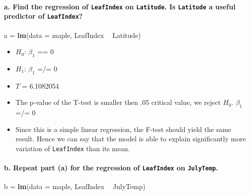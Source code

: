 \documentclass[]{article}
\newenvironment{Shaded}{\begin{snugshade}}{\end{snugshade}}
\newcommand{\KeywordTok}[1]{\textcolor[rgb]{0.13,0.29,0.53}{\textbf{#1}}}
\newcommand{\DataTypeTok}[1]{\textcolor[rgb]{0.13,0.29,0.53}{#1}}
\newcommand{\StringTok}[1]{\textcolor[rgb]{0.31,0.60,0.02}{#1}}
\newcommand{\OperatorTok}[1]{\textcolor[rgb]{0.81,0.36,0.00}{\textbf{#1}}}
\newcommand{\NormalTok}[1]{#1}
\providecommand{\tightlist}{%
  \setlength{\itemsep}{0pt}\setlength{\parskip}{0pt}}
\let\oldparagraph\paragraph
\renewcommand{\paragraph}[1]{\oldparagraph{#1}\mbox{}}
\begin{document}
\paragraph{\texorpdfstring{a. Find the regression of \texttt{LeafIndex}
on \texttt{Latitude}. Is \texttt{Latitude} a useful predictor of
\texttt{LeafIndex}?}{a. Find the regression of LeafIndex on Latitude. Is Latitude a useful predictor of LeafIndex?}}\label{a.-find-the-regression-of-leafindex-on-latitude.-is-latitude-a-useful-predictor-of-leafindex}

\begin{Shaded}
\begin{Highlighting}[]
\NormalTok{a =}\StringTok{ }\KeywordTok{lm}\NormalTok{(}\DataTypeTok{data =}\NormalTok{ maple, LeafIndex }\OperatorTok{~}\StringTok{ }\NormalTok{Latitude)}
\end{Highlighting}
\end{Shaded}

\begin{itemize}
\tightlist
\item
  \(H_{0}\): \(\beta_{1}\) == 0
\item
  \(H_{1}\): \(\beta_{1}\) =/= 0
\item
  \(T\) = 6.1082054
\item
  The p-value of the T-test is smaller then .05 critical value, we
  reject \(H_{0}\). \(\beta_{1}\) =/= 0
\item
  Since this is a simple linear regression, the F-test should yield the
  same result. Hence we can say that the model is able to explain
  significantly more variation of \texttt{LeafIndex} than its mean. 
\end{itemize}

\paragraph{\texorpdfstring{b. Repeat part (a) for the regression of
\texttt{LeafIndex} on
\texttt{JulyTemp}.}{b. Repeat part (a) for the regression of LeafIndex on JulyTemp.}}\label{b.-repeat-part-a-for-the-regression-of-leafindex-on-julytemp.}

\begin{Shaded}
\begin{Highlighting}[]
\NormalTok{b =}\StringTok{ }\KeywordTok{lm}\NormalTok{(}\DataTypeTok{data =}\NormalTok{ maple, LeafIndex }\OperatorTok{~}\StringTok{ }\NormalTok{JulyTemp)}
\end{Highlighting}
\end{Shaded}
\end{document}
